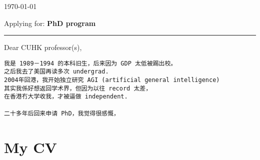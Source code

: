 
\today

{\small Applying for: \textbf{PhD program}}

\begin{center}
	\rule{0.8\textwidth}{1pt}
\end{center}

Dear CUHK professor(s),

\begin{verbatim}
我是 1989－1994 的本科旧生，后来因为 GDP 太低被踢出校。 
之后我去了美国再读多次 undergrad. 
2004年回港，我开始独立研究 AGI (artificial general intelligence) 
其实我係好想返回学术界，但因为以往 record 太差，
在香港冇大学收我，才被逼做 independent. 

二十多年后回来申请 PhD，我觉得很感慨，

\end{verbatim}

\section*{My CV}

